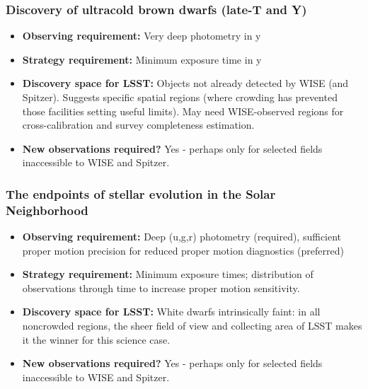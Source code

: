\subsubsection{Discovery of ultracold brown dwarfs (late-T and Y)}
\vspace{-2mm}
\begin{itemize}
\item {\bf Observing requirement:} Very deep photometry in y \vspace{-2mm}
\item {\bf Strategy requirement:} Minimum exposure time in y \vspace{-2mm}
\item {\bf Discovery space for LSST:} Objects not already detected by WISE (and Spitzer). Suggests specific spatial regions (where crowding has prevented those facilities setting useful limits). May need WISE-observed regions for cross-calibration and survey completeness estimation. \vspace{-2mm}
\item {\bf New observations required?} Yes - perhaps only for selected fields inaccessible to WISE and Spitzer. 
\end{itemize}

\subsubsection{The endpoints of stellar evolution in the Solar Neighborhood}
\vspace{-2mm}
\begin{itemize}
\item {\bf Observing requirement:} Deep (u,g,r) photometry (required), sufficient proper motion precision for reduced proper motion diagnostics (preferred)
\vspace{-2mm}
\item {\bf Strategy requirement:} Minimum exposure times; distribution of observations through time to increase proper motion sensitivity.
\vspace{-2mm}
\item {\bf Discovery space for LSST:} White dwarfs intrinsically faint: in all noncrowded regions, the sheer field of view and collecting area of LSST makes it the winner for this science case.
\vspace{-2mm}
\item {\bf New observations required?} Yes - perhaps only for selected fields inaccessible to WISE and Spitzer. 
\end{itemize}

